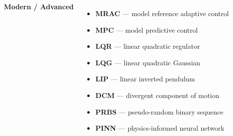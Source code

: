 \begin{frame}
\begin{columns}[t]
\vspace{0.15cm}
\textbf{Modern / Advanced}
\begin{itemize}\setlength\itemsep{0.05cm}
    \item \textbf{MRAC} --- model reference adaptive control
    \item \textbf{MPC} --- model predictive control
    \item \textbf{LQR} --- linear quadratic regulator
    \item \textbf{LQG} --- linear quadratic Gaussian
    \item \textbf{LIP} --- linear inverted pendulum
    \item \textbf{DCM} --- divergent component of motion
    \item \textbf{PRBS} --- pseudo-random binary sequence
    \item \textbf{PINN} --- physics-informed neural network
\end{itemize}

\end{columns}

\end{frame}

